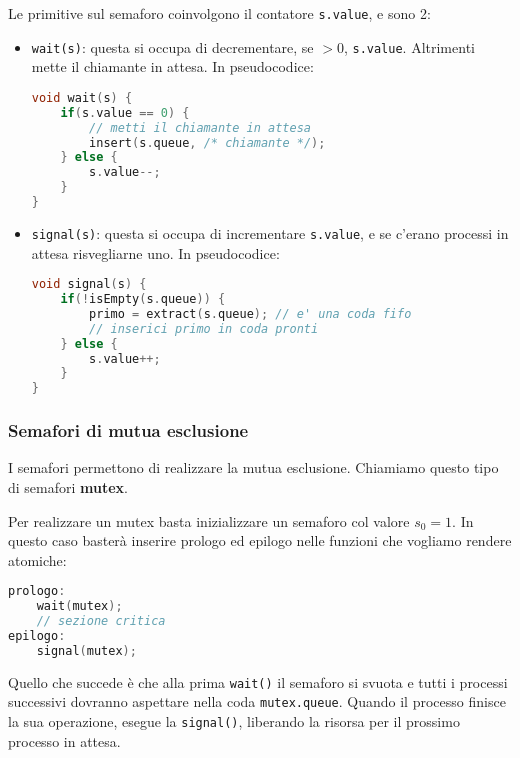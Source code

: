 \documentclass[a4paper,11pt]{article}
\begin{document}
Le primitive sul semaforo coinvolgono il contatore \lstinline|s.value|, e sono 2:
\begin{itemize}
	\item \lstinline|wait(s)|: questa si occupa di decrementare, se $> 0$, \lstinline|s.value|. Altrimenti mette il chiamante in attesa. In pseudocodice:
\begin{lstlisting}[language=C++, style=codestyle]	
void wait(s) {
	if(s.value == 0) {
		// metti il chiamante in attesa
		insert(s.queue, /* chiamante */);	
	} else {
		s.value--;
	}
}
\end{lstlisting}
	
	\item \lstinline|signal(s)|: questa si occupa di incrementare \lstinline|s.value|, e se c'erano processi in attesa risvegliarne uno. In pseudocodice:
\begin{lstlisting}[language=C++, style=codestyle]	
void signal(s) {
	if(!isEmpty(s.queue)) {
		primo = extract(s.queue); // e' una coda fifo
		// inserici primo in coda pronti
	} else {
		s.value++;
	}
}
\end{lstlisting}
\end{itemize}

\subsubsection{Semafori di mutua esclusione}
I semafori permettono di realizzare la mutua esclusione. Chiamiamo questo tipo di semafori \textbf{mutex}.

Per realizzare un mutex basta inizializzare un semaforo col valore $s_0 = 1$.
In questo caso basterà inserire prologo ed epilogo nelle funzioni che vogliamo rendere atomiche:
\begin{lstlisting}[language=C++, style=codestyle]	
prologo:
	wait(mutex);
	// sezione critica
epilogo:
	signal(mutex);
\end{lstlisting}

Quello che succede è che alla prima \lstinline|wait()| il semaforo si svuota e tutti i processi successivi dovranno aspettare nella coda \lstinline|mutex.queue|.
Quando il processo finisce la sua operazione, esegue la \lstinline|signal()|, liberando la risorsa per il prossimo processo in attesa. 
\end{document}
